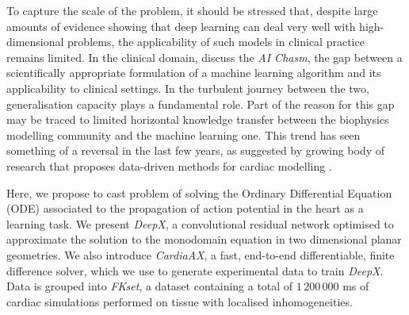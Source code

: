 \documentclass[utf8]{frontiersSCNS} %
\begin{document}
To capture the scale of the problem, it should be stressed that, despite large amounts of evidence showing that deep learning can deal very well with high-dimensional problems, the applicability of such models in clinical practice remains limited. In the clinical domain, \cite{Keane2018WithDiagnosis} discuss the \textit{AI Chasm}, the gap between a scientifically appropriate formulation of a machine learning algorithm and its applicability to clinical settings. In the turbulent journey between the two, generalisation capacity plays a fundamental role.
Part of the reason for this gap may be traced to limited horizontal knowledge transfer between the biophysics modelling community and the machine learning one. This trend has seen something of a reversal in the last few years, as suggested by growing body of research that proposes data-driven methods for cardiac modelling \cite[]{Cantwell2019RethinkingModelling, Herzog2018, SahliCostabal2020Physics-InformedMapping}.

Here, we propose to cast problem of solving the Ordinary Differential Equation (ODE) associated to the propagation of action potential in the heart as a learning task. We present \textit{DeepX}, a convolutional residual network optimised to approximate the solution to the monodomain equation in two dimensional planar geometries. We also introduce \textit{CardiaAX}, a fast, end-to-end differentiable, finite difference solver, which we use to generate experimental data to train \textit{DeepX}. Data is grouped into \textit{FKset}, a dataset containing a total of $1\,200\,000$ ms of cardiac simulations performed on tissue with localised inhomogeneities.

        
\end{document}
